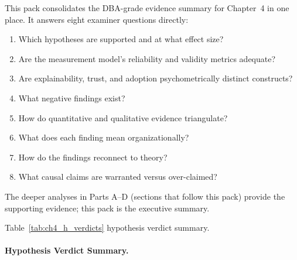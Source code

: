 \noindent This pack consolidates the DBA-grade evidence summary for Chapter~4 in one place. It answers eight examiner questions directly:
\begin{enumerate}[leftmargin=*, itemsep=1pt, label=(\arabic*)]
    \item Which hypotheses are supported and at what effect size?
    \item Are the measurement model's reliability and validity metrics adequate?
    \item Are explainability, trust, and adoption psychometrically distinct constructs?
    \item What negative findings exist?
    \item How do quantitative and qualitative evidence triangulate?
    \item What does each finding mean organizationally?
    \item How do the findings reconnect to theory?
    \item What causal claims are warranted versus over-claimed?
\end{enumerate}
\noindent The deeper analyses in Parts A--D (sections that follow this pack) provide the supporting evidence; this pack is the executive summary.

\noindent Table~\ref{tab:ch4_h_verdicts} hypothesis verdict summary.

\paragraph{Hypothesis Verdict Summary.}




